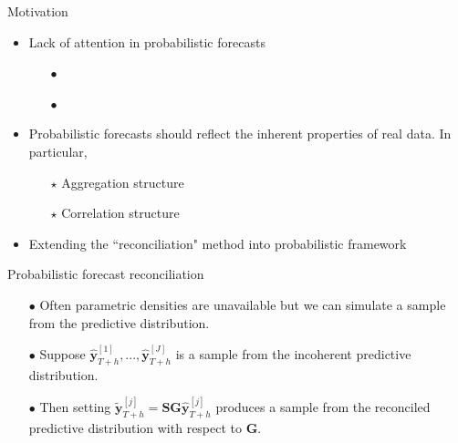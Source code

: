 \documentclass[11pt,xcolor=dvipsnames,handout]{beamer}
\begin{document}
%

\begin{frame}{Motivation}
\begin{itemize}[<+-| alert@+>]
	
	\item Lack of attention in probabilistic forecasts
	\begin{itemize}[<+-| alert@+>]
		\item[$\bullet$] \citet{BenTaieb2017}
		\item[$\bullet$] \citet{Jeon2018}
	\end{itemize}
	\item[]
	\item Probabilistic forecasts should reflect the inherent properties of real data. In particular, 
	\begin{itemize}[<+-| alert@+>]
		\item[$\star$] Aggregation structure
		\item[$\star$] Correlation structure
	\end{itemize}
	\item[]
	\item Extending the ``reconciliation" method into probabilistic framework
	
\end{itemize}
\end{frame}

\begin{frame}[noframenumbering]{Probabilistic forecast reconciliation}
\begin{itemize}[<+-| alert@+>]
	\item [$\bullet$] Often parametric densities are unavailable but we can simulate a sample from the predictive distribution.
	\item[]
	\item [$\bullet$] Suppose $\hat{\bm y}^{[1]}_{T+h},...,\hat{\bm y}^{[J]}_{T+h}$ is a sample from the incoherent predictive distribution.
	\item[]
	\item [$\bullet$] Then setting $\tilde{\bm y}^{[j]}_{T+h}=\bm{SG}\hat{\bm y}^{[j]}_{T+h}$ produces a sample from the reconciled predictive distribution with respect to $\bm{G}$.
\end{itemize}    
\end{frame}
\end{document}
